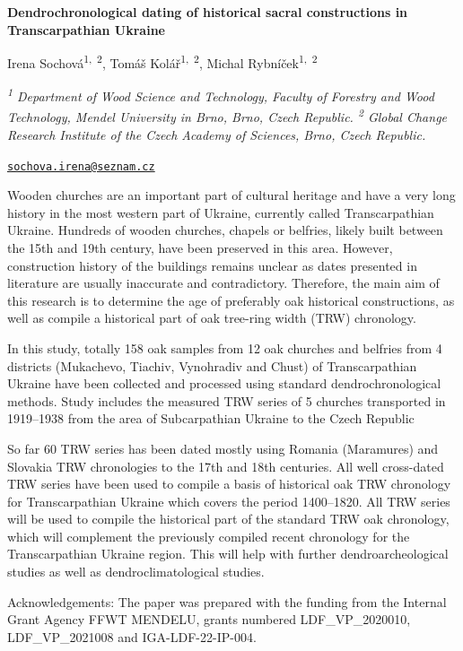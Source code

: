 \documentclass[
]{book}
\begin{document}
\textbf{Dendrochronological dating of historical sacral constructions in Transcarpathian Ukraine}

Irena Sochová\textsuperscript{1,~2}, Tomáš Kolář\textsuperscript{1,~2}, Michal Rybníček\textsuperscript{1,~2}

\emph{\textsuperscript{1} Department of Wood Science and Technology, Faculty of Forestry and Wood Technology, Mendel University in Brno, Brno, Czech Republic. \textsuperscript{2} Global Change Research Institute of the Czech Academy of Sciences, Brno, Czech Republic.}

\href{mailto:sochova.irena@seznam.cz}{\nolinkurl{sochova.irena@seznam.cz}}

Wooden churches are an important part of cultural heritage and have a very long history in the most western part of Ukraine, currently called Transcarpathian Ukraine. Hundreds of wooden churches, chapels or belfries, likely built between the 15th and 19th century, have been preserved in this area. However, construction history of the buildings remains unclear as dates presented in literature are usually inaccurate and contradictory. Therefore, the main aim of this research is to determine the age of preferably oak historical constructions, as well as compile a historical part of oak tree-ring width (TRW) chronology.

In this study, totally 158 oak samples from 12 oak churches and belfries from 4 districts (Mukachevo, Tiachiv, Vynohradiv and Chust) of Transcarpathian Ukraine have been collected and processed using standard dendrochronological methods. Study includes the measured TRW series of 5 churches transported in 1919--1938 from the area of Subcarpathian Ukraine to the Czech Republic

So far 60 TRW series has been dated mostly using Romania (Maramures) and Slovakia TRW chronologies to the 17th and 18th centuries. All well cross-dated TRW series have been used to compile a basis of historical oak TRW chronology for Transcarpathian Ukraine which covers the period 1400--1820. All TRW series will be used to compile the historical part of the standard TRW oak chronology, which will complement the previously compiled recent chronology for the Transcarpathian Ukraine region. This will help with further dendroarcheological studies as well as dendroclimatological studies.

Acknowledgements: The paper was prepared with the funding from the Internal Grant Agency FFWT MENDELU, grants numbered LDF\_VP\_2020010, LDF\_VP\_2021008 and IGA-LDF-22-IP-004.
\end{document}
